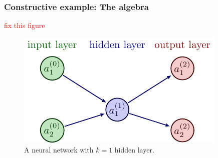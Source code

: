 \documentclass[11pt]{article}
\begin{document}
\subsubsection{Constructive example: The algebra}

\textcolor{red}{fix this figure}

\begin{figure}[ht]
    \centering
    \includegraphics{./figures/neural_nets/MLP_2.pdf}
    \caption{\centering A neural network with $k=1$ hidden layer.}
    \label{fig:neural_nets_simple_example}
\end{figure}
\end{document}
